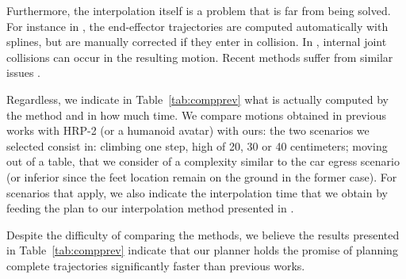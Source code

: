Furthermore, the interpolation itself is a problem that is far from being solved. For instance in \cite{DBLP:conf/iser/EscandeKMG08}, the end-effector trajectories are computed automatically with splines, but are manually corrected if they enter in collision. In \citep{Mordatch:2012:DCB:2185520.2185539}, internal joint collisions can occur in the resulting motion.
Recent methods suffer from similar issues \citep{Carpentier2016}.


Regardless, we indicate in Table~\ref{tab:compprev} what is actually computed by the method and in how much time.
We compare motions obtained in previous works with HRP-2 (or a humanoid avatar) with ours: the two scenarios we selected consist in:  climbing one step, high of 20, 30 or 40 centimeters; 
moving out of a table, that we consider of a complexity similar to the car egress scenario (or inferior since the feet location remain on the ground in the former case).
For scenarios that apply, we also indicate the interpolation time that we obtain by feeding the plan to our interpolation method presented in \cite{Carpentier2016}.

Despite the difficulty of comparing the methods, we believe the results presented in Table~\ref{tab:compprev} indicate that our planner holds the promise of planning complete trajectories significantly faster than previous works.



